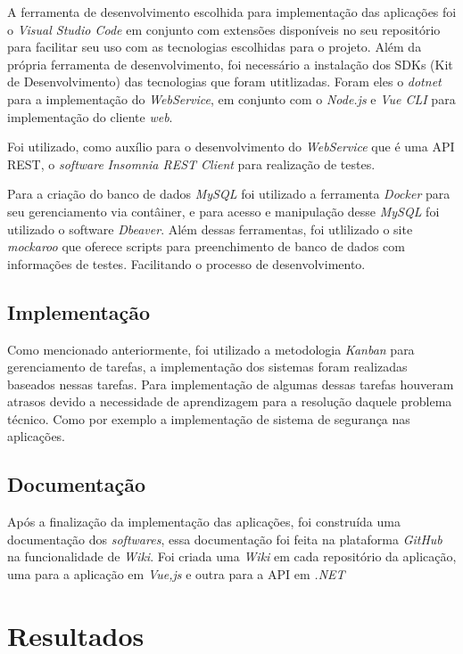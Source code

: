 \documentclass[12pt]{article}
\begin{document}
A ferramenta de desenvolvimento escolhida para implementação
das aplicações foi o \textit{Visual Studio Code} em conjunto com extensões disponíveis
no seu repositório para facilitar seu uso com as tecnologias escolhidas para o projeto. Além
da própria ferramenta de desenvolvimento, foi necessário a instalação dos SDKs
(Kit de Desenvolvimento) das tecnologias que foram utitlizadas. Foram eles o \textit{dotnet} para a implementação do \textit{WebService},
em conjunto com o \textit{Node.js} e \textit{Vue CLI} para implementação do cliente \textit{web}.

Foi utilizado, como auxílio para o desenvolvimento do \textit{WebService} que é uma API REST, o
\textit{software} \textit{Insomnia REST Client} para realização de testes.

Para a criação do banco de dados \textit{MySQL} foi utilizado a ferramenta \textit{Docker} para
seu gerenciamento via contâiner, e para acesso e manipulação desse \textit{MySQL} foi utilizado o software \textit{Dbeaver}.
Além dessas ferramentas, foi utlilizado o site \textit{mockaroo} que oferece scripts para preenchimento
de banco de dados com informações de testes. Facilitando o processo de desenvolvimento.

\subsection{Implementação}

Como mencionado anteriormente, foi utilizado a metodologia \textit{Kanban} para gerenciamento
de tarefas, a implementação dos sistemas foram realizadas baseados nessas tarefas.
Para implementação de algumas dessas tarefas houveram atrasos devido a necessidade de aprendizagem
para a resolução daquele problema técnico. Como por exemplo a implementação de sistema de segurança nas aplicações.

\subsection{Documentação}

Após a finalização da implementação das aplicações, foi construída uma documentação
dos \textit{softwares}, essa documentação foi feita na plataforma \textit{GitHub} na funcionalidade
de \textit{Wiki}. Foi criada uma \textit{Wiki} em cada repositório da aplicação, uma para a aplicação em \textit{Vue,js}
e outra para a API em \textit{.NET}

\section{Resultados}\label{Resultados}
\end{document}
